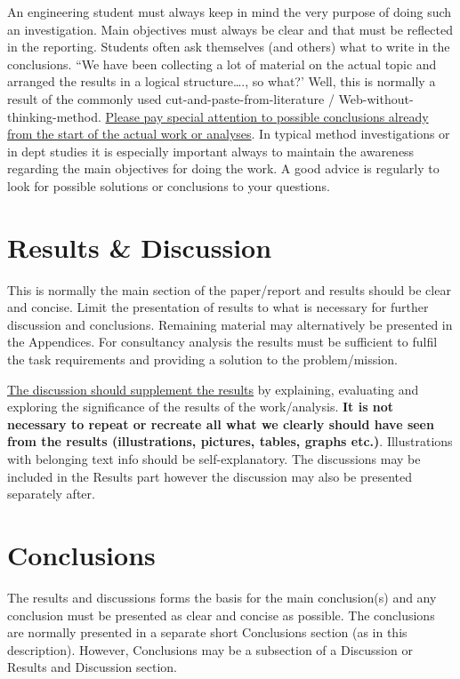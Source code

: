 \documentclass[a4paper,12pt]{extarticle}
\begin{document}
An engineering student must always keep in mind the very purpose of doing such an investigation. Main objectives must always be clear and that must be reflected in the reporting. Students often ask themselves (and others) what to write in the conclusions. “We have been collecting a lot of material on the actual topic and arranged the results in a logical structure…., so what?’ Well, this is normally a result of the commonly used cut-and-paste-from-literature / Web-without-thinking-method. \ul{Please pay special attention to possible conclusions already from the start of the actual work or analyses}. In typical method investigations or in dept studies it is especially important always to maintain the awareness regarding the main objectives for doing the work. A good advice is regularly to look for possible solutions or conclusions to your questions.

\section{Results \& Discussion}
This is normally the main section of the paper/report and results should be clear and concise. Limit the presentation of results to what is necessary for further discussion and conclusions. Remaining material may alternatively be presented in the Appendices. For consultancy analysis the results must be sufficient to fulfil the task requirements and providing a solution to the problem/mission.

\ul{The discussion should supplement the results} by explaining, evaluating and exploring the significance of the results of the work/analysis. \textbf{It is not necessary to repeat or recreate all what we clearly should have seen from the results (illustrations, pictures, tables, graphs etc.)}. Illustrations with belonging text info should be self-explanatory. The discussions may be included in the Results part however the discussion may also be presented separately after.

\section{Conclusions}
The results and discussions forms the basis for the main conclusion(s) and any conclusion must be presented as clear and concise as possible. The conclusions are normally presented in a separate short Conclusions section (as in this description). However, Conclusions may be a subsection of a Discussion or Results and Discussion section.
\end{document}
